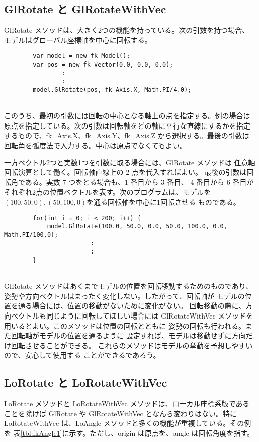 \subsection{GlRotate と GlRotateWithVec}
GlRotate メソッドは、大きく2つの機能を持っている。次の引数を持つ場合、
モデルはグローバル座標軸を中心に回転する。
\\
\begin{breakbox}
\begin{verbatim}
        var model = new fk_Model();
        var pos = new fk_Vector(0.0, 0.0, 0.0);
                :
                :
        model.GlRotate(pos, fk_Axis.X, Math.PI/4.0);
\end{verbatim}
\end{breakbox}
~ \\
このうち、最初の引数には回転の中心となる軸上の点を指定する。例の場合は
原点を指定している。次の引数は回転軸をどの軸に平行な直線にするかを指定
するもので、fk\_Axis.X、fk\_Axis.Y、fk\_Axis.Z から選択する。最後の引数は
回転角を弧度法で入力する。中心は原点でなくてもよい。

一方ベクトル2つと実数1つを引数に取る場合には、GlRotate メソッドは
任意軸回転演算として働く。回転軸直線上の 2 点を代入すればよい。
最後の引数は回転角である。実数 7 つをとる場合も、1 番目から 3 番目、
4 番目から 6 番目がそれぞれ2点の位置ベクトルを表す。次のプログラムは、モデルを
\((100, 50, 0), (50, 100, 0)\)を通る回転軸を中心に1回転させる
ものである。
\\
\begin{breakbox}
\begin{verbatim}
        for(int i = 0; i < 200; i++) {
            model.GlRotate(100.0, 50.0, 0.0, 50.0, 100.0, 0.0, Math.PI/100.0);
                        :
                        :
        }
\end{verbatim}
\end{breakbox}
~ \\
GlRotate メソッドはあくまでモデルの位置を回転移動するためのものであり、
姿勢や方向ベクトルはまったく変化しない。したがって、回転軸が
モデルの位置を通る場合には、位置の移動がないために変化がない。
回転移動の際に、方向ベクトルも同じように回転してほしい場合には
GlRotateWithVec メソッドを用いるとよい。このメソッドは位置の回転とともに
姿勢の回転も行われる。また回転軸がモデルの位置を通るように
設定すれば、モデルは移動せずに方向だけ回転させることができる。
これらのメソッドはモデルの挙動を予想しやすいので、安心して使用する
ことができるであろう。

\subsection{LoRotate と LoRotateWithVec}
LoRotate メソッドと LoRotateWithVec メソッドは、ローカル座標系版である
ことを除けば GlRotate や GlRotateWithVec となんら変わりはない。特に
LoRotateWithVec は、LoAngle メソッドと多くの機能が重複している。その例を
表\ref{tbl:fkAngle1}に示す。ただし、origin は原点を、angle は回転角度を指す。

